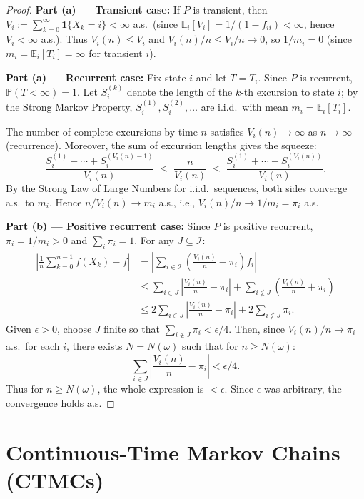\documentclass[12pt, a4paper]{article}
\theoremstyle{definition}
\theoremstyle{plain}
\newcommand{\PP}{\mathbb{P}}
\newcommand{\EE}{\mathbb{E}}
\begin{document}
\begin{proof}
\textbf{Part (a) — Transient case:} If $P$ is transient, then $V_i:=\sum_{k=0}^\infty\mathbf{1}\{X_k=i\}<\infty$ a.s.\ (since $\EE_i[V_i]=1/(1-f_{ii})<\infty$, hence $V_i<\infty$ a.s.). Thus $V_i(n)\le V_i$ and $V_i(n)/n\le V_i/n\to 0$, so $1/m_i=0$ (since $m_i=\EE_i[T_i]=\infty$ for transient $i$).

\textbf{Part (a) — Recurrent case:} Fix state $i$ and let $T=T_i$. Since $P$ is recurrent, $\PP(T<\infty)=1$. Let $S_i^{(k)}$ denote the length of the $k$-th excursion to state $i$; by the Strong Markov Property, $S_i^{(1)},S_i^{(2)},\ldots$ are i.i.d.\ with mean $m_i=\EE_i[T_i]$.

The number of complete excursions by time $n$ satisfies $V_i(n)\to\infty$ as $n\to\infty$ (recurrence). Moreover, the sum of excursion lengths gives the squeeze:
\[
  \frac{S_i^{(1)}+\cdots+S_i^{(V_i(n)-1)}}{V_i(n)} \;\le\; \frac{n}{V_i(n)} \;\le\; \frac{S_i^{(1)}+\cdots+S_i^{(V_i(n))}}{V_i(n)}.
\]
By the Strong Law of Large Numbers for i.i.d.\ sequences, both sides converge a.s.\ to $m_i$. Hence $n/V_i(n)\to m_i$ a.s., i.e., $V_i(n)/n\to 1/m_i = \pi_i$ a.s.

\textbf{Part (b) — Positive recurrent case:} Since $P$ is positive recurrent, $\pi_i=1/m_i>0$ and $\sum_i\pi_i=1$. For any $J\subseteq\mathcal{I}$:
\begin{align*}
  \left|\frac{1}{n}\sum_{k=0}^{n-1}f(X_k)-\bar{f}\right| &= \left|\sum_{i\in\mathcal{I}}\left(\frac{V_i(n)}{n}-\pi_i\right)f_i\right|\\
  &\le \sum_{i\in J}\left|\frac{V_i(n)}{n}-\pi_i\right| + \sum_{i\notin J}\left(\frac{V_i(n)}{n}+\pi_i\right)\\
  &\le 2\sum_{i\in J}\left|\frac{V_i(n)}{n}-\pi_i\right| + 2\sum_{i\notin J}\pi_i.
\end{align*}
Given $\epsilon>0$, choose $J$ finite so that $\sum_{i\notin J}\pi_i<\epsilon/4$. Then, since $V_i(n)/n\to\pi_i$ a.s.\ for each $i$, there exists $N=N(\omega)$ such that for $n\ge N(\omega)$:
\[
  \sum_{i\in J}\left|\frac{V_i(n)}{n}-\pi_i\right|<\epsilon/4.
\]
Thus for $n\ge N(\omega)$, the whole expression is $<\epsilon$. Since $\epsilon$ was arbitrary, the convergence holds a.s.
\end{proof}


\section{Continuous-Time Markov Chains (CTMCs)}
\end{document}
